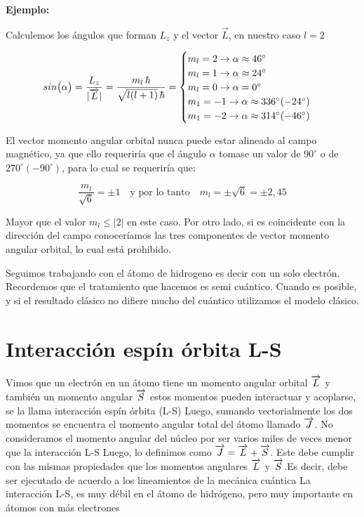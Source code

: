 \textbf{Ejemplo:}

Calculemos los ángulos que forman $L_{z}$ y el vector $\overrightarrow{L}$, en nuestro caso $l = 2$


\begin{equation}
  sin \big(\alpha\big)=\frac{L_{z}}{|\overrightarrow{L}|}=\frac{m_{l}\,\hbar}{\sqrt{l(l+1)} \, \hbar}=\begin{cases}
  				m_{l}=2 \rightarrow\alpha\approx 46^{\circ} \\
  				m_{l}=1 \rightarrow\alpha\approx 24^{\circ} \\  				
  				m_{l}=0 \rightarrow\alpha=0^{\circ} \\
  				m_{1}=-1 \rightarrow\alpha\approx 336^{\circ} (-24^{\circ})\\
  				m_{1}=-2 \rightarrow\alpha\approx 314^{\circ} (-46^{\circ})
    			\end{cases}
\end{equation}

El vector momento angular orbital nunca puede estar alineado al campo magnético, ya que ello requeriría que el ángulo $\alpha$ tomase un valor de $90^{\circ}$ o de $270^{\circ} (-90^{\circ})$, para lo cual se requeriría que:

\begin{equation}
 \frac{m_{l}}{\sqrt{6}}= \pm1 \quad \text{y por lo tanto} \quad m_{l}=\pm\sqrt{6}= \pm2,45
\end{equation}

Mayor que el valor $m_{l}\leq|2|$ en este caso. Por otro lado, si es coincidente con la dirección del campo conoceríamos las tres componentes de vector momento angular orbital, lo cual está prohibido.

Seguimos trabajando con el átomo de hidrogeno es decir con un solo electrón. Recordemos que el tratamiento que hacemos es semi cuántico. Cuando es posible, y si el resultado clásico no difiere mucho del cuántico utilizamos el modelo clásico.

\section{Interacción espín órbita L-S}

Vimos que un electrón en un átomo tiene un momento angular orbital $\overrightarrow{L}$ y también un momento angular $\overrightarrow{S}$ estos momentos pueden interactuar y acoplarse, se la llama interacción espín órbita (L-S) Luego, sumando vectorialmente los dos momentos se encuentra el momento angular total del átomo llamado $\overrightarrow{J}$. No consideramos el momento angular del núcleo por ser varios miles de veces menor que la interacción L-S Luego, lo definimos como $\overrightarrow{J}=\overrightarrow{L}+\overrightarrow{S}$. Este debe cumplir con las mismas propiedades que los momentos angulares $\overrightarrow{L}$ y $\overrightarrow{S}$.Es decir, debe ser ejecutado de acuerdo a los lineamientos de la mecánica cuántica La interacción L-S, es muy débil en el átomo de hidrógeno, pero muy importante en átomos con más electrones 

